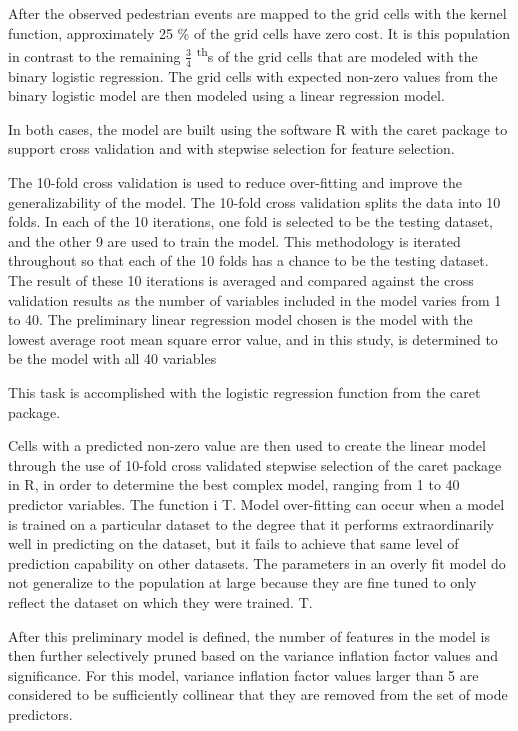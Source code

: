 \documentclass{llncs}
\begin{document}
After the observed pedestrian events are mapped to the grid cells with the kernel function,  approximately 25 \% of the grid cells have zero cost.  It is this population in contrast to the remaining $\frac{3}{4}$ \textsuperscript{th}s of the grid cells that are modeled with the binary logistic regression. The grid cells with expected non-zero values from the binary logistic model are then modeled using a linear regression model. 

In both cases, the model are built using the software R with the caret package to support cross validation and with stepwise selection for feature selection.

The 10-fold cross validation is used to reduce over-fitting and improve the generalizability of the model. The 10-fold cross validation splits the data into 10 folds. In each of the 10 iterations, one fold is selected to be the testing dataset, and the other 9 are used to train the model. This methodology is iterated throughout so that each of the 10 folds has a chance to be the testing dataset. The result of these 10 iterations is averaged and compared against the cross validation results as the number of variables included in the model varies from 1 to 40. The preliminary linear regression model chosen is the model with the lowest average root mean square error value, and in this study, is determined to be the model with all 40 variables

This task is accomplished with the logistic regression function from the caret package. 

Cells with a predicted non-zero value are then used to create the linear model through the use of 10-fold cross validated stepwise selection of the caret package in R, in order to determine the best complex model, ranging from 1 to 40 predictor variables. The function i T. Model over-fitting can occur when a model is trained on a particular dataset to the degree that it performs extraordinarily well in predicting on the dataset, but it fails to achieve that same level of prediction capability on other datasets. The parameters in an overly fit model do not generalize to the population at large because they are fine tuned to only reflect the dataset on which they were trained. T.

After this preliminary model is defined,  the number of features in the model is then further  selectively pruned based on the variance inflation factor values and significance. For this model, variance inflation factor values larger than 5 are considered to be sufficiently collinear that they are removed from the set of mode predictors.
\end{document}
